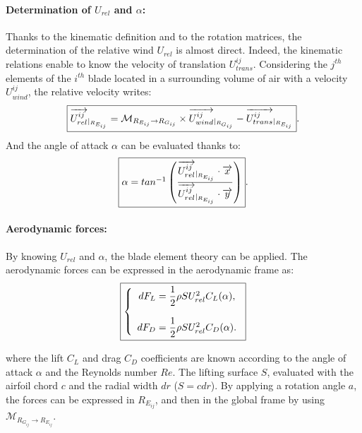 \paragraph*{Determination of $U_{rel}$ and $\alpha$:}
Thanks to the kinematic definition and to the rotation matrices, the determination of the relative wind $U_{rel}$ is almost direct. Indeed, the kinematic relations enable to know the velocity of translation $U^{ij}_{trans}$. Considering the $j^{th}$ elements of the $i^{th}$ blade located in a surrounding volume of air with a velocity $U^{ij}_{wind}$, the relative velocity writes:
\begin{equation}
\label{eq:AL_urel}
\fbox{$
\overrightarrow{U^{ij}_{rel}}_{\vert _{R_{E_{ij}}}} = \mathcal{M}_{R_{E_{ij}} \rightarrow R_{G_{ij}}} \times \overrightarrow{U^{ij}_{wind}}_{\vert _{R_{G_{ij}}}} - \overrightarrow{U^{ij}_{trans}}_{\vert _{R_{E_{ij}}}}
$}.
\end{equation}
And the angle of attack $\alpha$ can be evaluated thanks to:
\begin{equation}
\label{eq:AL_alpha}
\fbox{$
\alpha = tan^{-1} \left( \dfrac{\overrightarrow{U^{ij}_{rel}}_{\vert _{R_{E_{ij}}}} \cdot \overrightarrow{x}}{\overrightarrow{U^{ij}_{rel}}_{\vert _{R_{E_{ij}}}} \cdot \overrightarrow{y}} \right)
$}.
\end{equation}

\paragraph*{Aerodynamic forces:}
By knowing $U_{rel}$ and $\alpha$, the blade element theory can be applied. The aerodynamic forces can be expressed in the aerodynamic frame as:
\begin{equation}
\label{eq:eol_m_alm_eff}	
\fbox{$
\left\lbrace
\begin{array}{ccc}	
dF_{L} = \dfrac{1}{2} \rho S U_{rel}^2 C_L(\alpha),
\\   
\\
dF_{D} = \dfrac{1}{2} \rho S U_{rel}^2 C_D(\alpha).
\\
\end{array}\right.
$}
\end{equation}	

where the lift $C_L$ and drag $C_D$ coefficients are known according to the angle of attack $\alpha$ and the Reynolds number $Re$. The lifting surface $S$, evaluated with the airfoil chord $c$ and the radial width $dr$ ($S = c dr$). By applying a rotation angle $a$, the forces can be expressed in $R_{E_{ij}}$, and then in the global frame by using $\mathcal{M}_{R_{G_{ij}} \rightarrow R_{E_{ij}}}$.

